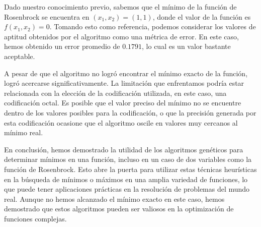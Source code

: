 Dado nuestro conocimiento previo, sabemos que el mínimo de la función de Rosenbrock se encuentra en $(x_1, x_2) = (1, 1)$, donde el valor de la función es $f(x_1, x_2) = 0$. Tomando esto como referencia, podemos considerar los valores de aptitud obtenidos por el algoritmo como una métrica de error. En este caso, hemos obtenido un error promedio de $0.1791$, lo cual es un valor bastante aceptable.

A pesar de que el algoritmo no logró encontrar el mínimo exacto de la función, logró acercarse significativamente. La limitación que enfrentamos podría estar relacionada con la elección de la codificación utilizada, en este caso, una codificación octal. Es posible que el valor preciso del mínimo no se encuentre dentro de los valores posibles para la codificación, o que la precisión generada por esta codificación ocasione que el algoritmo oscile en valores muy cercanos al mínimo real.

En conclusión, hemos demostrado la utilidad de los algoritmos genéticos para determinar mínimos en una función, incluso en un caso de dos variables como la función de Rosenbrock. Esto abre la puerta para utilizar estas técnicas heurísticas en la búsqueda de mínimos o máximos en una amplia variedad de funciones, lo que puede tener aplicaciones prácticas en la resolución de problemas del mundo real. Aunque no hemos alcanzado el mínimo exacto en este caso, hemos demostrado que estos algoritmos pueden ser valiosos en la optimización de funciones complejas.